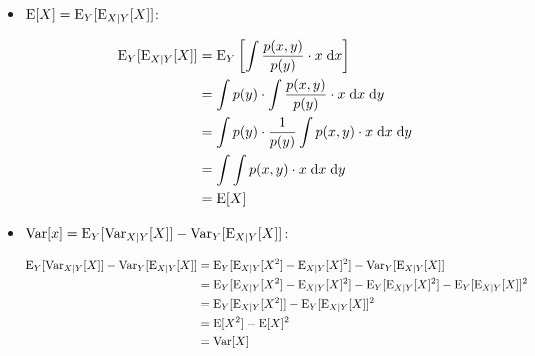 \begin{itemize}
 \item{$\mathrm{E}[X] = \mathrm{E}_Y[\mathrm{E}_{X|Y}[X]]$:

\begin{align*}
\mathrm{E}_Y[\mathrm{E}_{X|Y}[X]] &= \mathrm{E}_Y\left[\int \frac{p(x,y)}{p(y)} \cdot x \;\mathrm{d} x\right] \\
 &= \int p(y) \cdot \int\frac{p(x,y)}{p(y)} \cdot x\;\mathrm{d} x \;\mathrm{d} y \\
 &= \int p(y) \cdot \frac{1}{p(y)} \int p(x,y) \cdot x \;\mathrm{d} x \;\mathrm{d} y \\
 &= \int \int p(x,y) \cdot x \;\mathrm{d} x \;\mathrm{d} y \\
 &= \mathrm{E}[X]
\end{align*}
}

 \item{$\mathrm{Var}[x] = \mathrm{E}_Y[\mathrm{Var}_{X|Y}[X]]-\mathrm{Var}_Y[\mathrm{E}_{X|Y}[X]]$:

\begin{align*}
\mathrm{E}_Y[\mathrm{Var}_{X|Y}[X]] - \mathrm{Var}_Y[\mathrm{E}_{X|Y}[X]] &= \mathrm{E}_Y[\mathrm{E}_{X|Y}[X^2]-\mathrm{E}_{X|Y}[X]^2]-\mathrm{Var}_Y[\mathrm{E}_{X|Y}[X]] \\
 &= \mathrm{E}_Y[\mathrm{E}_{X|Y}[X^2]-\mathrm{E}_{X|Y}[X]^2]-\mathrm{E}_Y[\mathrm{E}_{X|Y}[X]^2] -\mathrm{E}_Y[\mathrm{E}_{X|Y}[X]]^2 \\
 &= \mathrm{E}_Y[\mathrm{E}_{X|Y}[X^2]] - \mathrm{E}_Y[\mathrm{E}_{X|Y}[X]]^2 \\
 &= \mathrm{E}[X^2]-\mathrm{E}[X]^2 \\
 &= \mathrm{Var}[X]
\end{align*}
}
\end{itemize}

